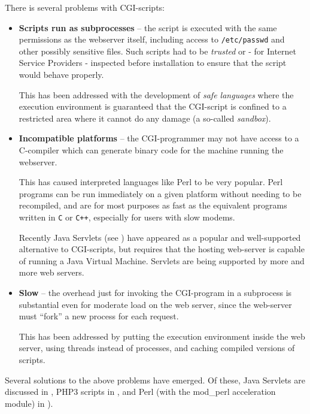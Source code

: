 
There is several problems with CGI-scripts:

\begin{itemize}
\item \textbf{Scripts run as subprocesses} -- the script is executed
  with the same permissions as the webserver itself, including access
  to \texttt{/etc/passwd} and other possibly sensitive files.  Such
  scripts had to be \textit{trusted} or - for Internet Service
  Providers - inspected before installation to ensure that the script
  would behave properly.
  
  This has been addressed with the development of \textit{safe
    languages} where the execution environment is guaranteed that the
  CGI-script is confined to a restricted area where it cannot do any
    damage (a so-called \textit{sandbox}).

\item \textbf{Incompatible platforms} -- the CGI-programmer may not
  have access to a C-compiler which can generate binary code for the
  machine running the webserver.

  This has caused interpreted languages like Perl to be very popular.
  Perl programs can be run immediately on a given platform without
  needing to be recompiled, and are for most purposes as fast as the
  equivalent programs written in \texttt{C} or \texttt{C++},
  especially for users with slow modems.
  
  Recently Java Servlets (see ) have
  appeared as a popular and well-supported alternative to CGI-scripts,
  but requires that the hosting web-server is capable of running a
  Java Virtual Machine.  Servlets are being supported by more and more
  web servers.

\item \textbf{Slow} -- the overhead just for invoking the CGI-program
  in a subprocess is substantial even for moderate load on the web
  server, since the web-server must ``fork'' a new process for each
  request.

  This has been addressed by putting the execution environment inside
  the web server, using threads instead of processes, and caching
  compiled versions of scripts.

\end{itemize}

Several solutions to the above problems have emerged.  Of these, Java
Servlets are discussed in , PHP3
scripts in , and Perl (with the mod\_perl
acceleration module) in ).

